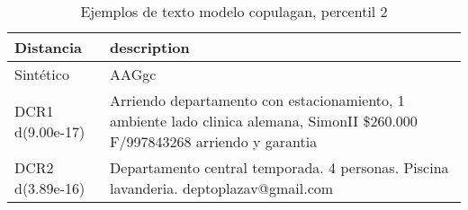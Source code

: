\begin{table}[H]
\centering
\fontsize{10}{14}\selectfont
\caption{Ejemplos de texto modelo copulagan, percentil 2}
\label{table-example-economicos-b-3-copulagan-2p-text}
\begin{tabular}{|l|m{35em}|}
\hline
\rowcolor[gray]{0.8}
Distancia & description \\
\hline Sintético & AAGgc \\
\hline DCR1 d(9.00e-17) & Arriendo departamento con estacionamiento, 1 ambiente lado clinica alemana, SimonII \$260.000 F/997843268 arriendo y garantia \\
\hline DCR2 d(3.89e-16) & Departamento central temporada. 4 personas. Piscina lavanderia.  deptoplazav@gmail.com \\
\hline
\end{tabular}
\end{table}
